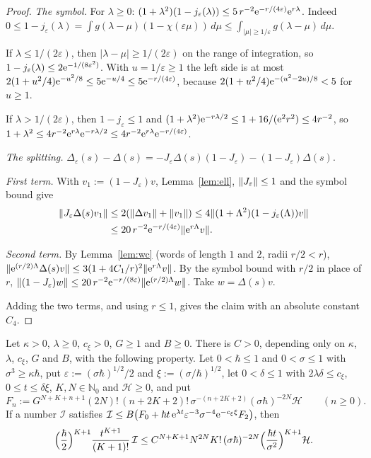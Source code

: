 \begin{proof}
\emph{The symbol.} For $\lambda\ge0$: $(1+\lambda^2)(1-j_\varepsilon(\lambda))\le5\,r^{-2}\mathrm{e}^{-r/(4\varepsilon)}\mathrm{e}^{r\lambda}$. Indeed
$0\le1-j_\varepsilon(\lambda)=\int g(\lambda-\mu)(1-\chi(\varepsilon\mu))\,d\mu\le\int_{|\mu|\ge1/\varepsilon}g(\lambda-\mu)\,d\mu$.

If $\lambda\le1/(2\varepsilon)$, then $|\lambda-\mu|\ge1/(2\varepsilon)$ on the range of integration, so
  $1-j_\varepsilon(\lambda)\le2\mathrm{e}^{-1/(8\varepsilon^2)}$. With $u=1/\varepsilon\ge1$ the left side is at most
  $2(1+u^2/4)\mathrm{e}^{-u^2/8}\le5\mathrm{e}^{-u/4}\le5\mathrm{e}^{-r/(4\varepsilon)}$, because $2(1+u^2/4)\mathrm{e}^{-(u^2-2u)/8}<5$ for $u\ge1$.

If $\lambda>1/(2\varepsilon)$, then $1-j_\varepsilon\le1$ and $(1+\lambda^2)\mathrm{e}^{-r\lambda/2}\le1+16/(\mathrm{e}^2r^2)\le4r^{-2}$, so
  $1+\lambda^2\le4r^{-2}\mathrm{e}^{r\lambda}\mathrm{e}^{-r\lambda/2}\le4r^{-2}\mathrm{e}^{r\lambda}\mathrm{e}^{-r/(4\varepsilon)}$.

\emph{The splitting.} $\Delta_\varepsilon(s)-\Delta(s)=-J_\varepsilon\Delta(s)(1-J_\varepsilon)-(1-J_\varepsilon)\Delta(s)$.

\emph{First term.} With $v_1:=(1-J_\varepsilon)v$, Lemma~\ref{lem:ell}, $\lVert J_\varepsilon\rVert\le1$ and the symbol bound give
\[
\begin{aligned}
\lVert J_\varepsilon\Delta(s)v_1\rVert&\le2(\lVert \Delta v_1\rVert+\lVert v_1\rVert)
\le4\lVert (1+\Lambda^2)(1-j_\varepsilon(\Lambda))v\rVert\\
&\le20\,r^{-2}\mathrm{e}^{-r/(4\varepsilon)}\lVert \mathrm{e}^{r\Lambda}v\rVert.
\end{aligned}
\]

\emph{Second term.} By Lemma~\ref{lem:wc} (words of length $1$ and $2$, radii $r/2<r$),
$\lVert \mathrm{e}^{(r/2)\Lambda}\Delta(s)v\rVert\le3(1+4C_1/r)^2\lVert \mathrm{e}^{r\Lambda}v\rVert$. By the symbol bound with $r/2$ in place of $r$,
$\lVert (1-J_\varepsilon)w\rVert\le20\,r^{-2}\mathrm{e}^{-r/(8\varepsilon)}\lVert \mathrm{e}^{(r/2)\Lambda}w\rVert$. Take $w=\Delta(s)v$.

Adding the two terms, and using $r\le1$, gives the claim with an absolute constant $C_4$. \qedhere
\end{proof}

\begin{lemma}\label{lem:collect}
Let $\kappa>0$, $\lambda\ge0$, $c_\xi>0$, $G\ge1$ and $B\ge0$. There is $C>0$, depending only on $\kappa$, $\lambda$, $c_\xi$, $G$ and
$B$, with the following property. Let $0<\hbar\le1$ and $0<\sigma\le1$ with $\sigma^3\ge\kappa\hbar$, put $\varepsilon:=(\sigma\hbar)^{1/2}/2$ and
$\xi:=(\sigma/\hbar)^{1/2}$, let $0<\delta\le1$ with $2\lambda\delta\le c_\xi$, $0\le t\le\delta\xi$, $K,N\in\mathbb N_0$ and $\mathcal H\ge0$, and put
\[
  F_n:=G^{N+K+n+1}(2N)!\,(n+2K+2)!\,\sigma^{-(n+2K+2)}(\sigma\hbar)^{-2N}\mathcal H\qquad(n\ge0).
\]
If a number $\mathcal I$ satisfies $\mathcal I\le B\bigl(F_0+\hbar t\,\mathrm{e}^{\lambda t}\varepsilon^{-3}\sigma^{-4}\mathrm{e}^{-c_\xi\xi}F_2\bigr)$, then
\[
  \Bigl(\frac\hbar2\Bigr)^{K+1}\frac{t^{K+1}}{(K+1)!}\,\mathcal I\le C^{N+K+1}N^{2N}K!\,(\sigma\hbar)^{-2N}\Bigl(\frac{\hbar t}{\sigma^2}\Bigr)^{K+1}\mathcal H.
\]
\end{lemma}

